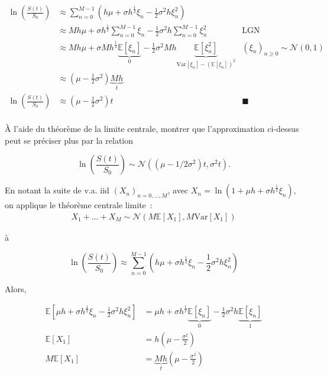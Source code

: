 \documentclass[answers, 10pt]{exam}
\begin{document}
\begin{questions}
\begin{solutionorbox}
		\begin{align*}
			\ln \left(  \frac{S(t)}{S_0} \right) &\approx \sum_{n=0}^{M-1}\left(  h\mu + \sigma h^{\frac{1}{2}} \xi_n - \frac{1}{2} \sigma^2 h \xi_n^2 \right)  \\
							     &\approx M h\mu + \sigma h^\frac{1}{2} \sum_{n=0}^{M-1} \xi_n - \frac{1}{2} \sigma^2 h \sum_{n=0}^{M-1} \xi_n^2 & \text{LGN}\\
							     &\approx M h \mu + \sigma M h^\frac{1}{2} \underbrace{\mathbb{E}\left[ \xi_n \right]}_{0} - \frac{1}{2} \sigma^2 Mh\underbrace{\mathbb{E}\left[ \xi_n^2 \right]}_{\text{Var}\left[\xi_n \right] - (\mathbb{E}\left[\xi_n \right])^2 } & (\xi_n)_{n\geq 0} \sim \mathcal{N}(0, 1)\\
							     &\approx \left(\mu - \frac{1}{2} \sigma^2  \right) \underbrace{Mh}_{t}\\
				\ln \left(  \frac{S(t)}{S_0} \right) &\approx \left(\mu - \frac{1}{2} \sigma^2  \right) t & \blacksquare\\
		\end{align*}
	\end{solutionorbox}

	\question
	\`A l'aide du théorème de la limite centrale, montrer que l'approximation ci-dessus peut se préciser plus par la relation

		\begin{equation*}
			\ln \left( \frac{S(t)}{S_0} \right) \sim \mathcal{N} \left(  \left(  \mu - 1/2 \sigma^2 \right)t, \sigma^2 t \right).
		\end{equation*}
	
	\begin{solutionorbox}
		En notant la suite de v.a. iid $(X_n)_{n=0,\dots,M}$, avec $X_n = \ln \left( 1 + \mu h + \sigma h^\frac{1}{2} \xi_n \right)$, on applique le théorème centrale limite~:
		\begin{align*}
			X_{1} + \dots + X_{M} \sim \mathcal{N}\left(M \mathbb{E}\left[X_1 \right], M \text{Var}\left[X_1 \right]\right)
		\end{align*}

		à 

		\begin{equation*}
			\ln \left(  \frac{S(t)}{S_0} \right) \approx \sum_{n=0}^{M-1}\left(  h\mu + \sigma h^{\frac{1}{2}} \xi_n - \frac{1}{2} \sigma^2 h \xi_n^2 \right)
		\end{equation*}

		Alors, 

		\begin{align*}			
			\mathbb{E}\left[\mu h + \sigma h^{\frac{1}{2}} \xi_n - \frac{1}{2} \sigma^2 h \xi_n^2\right] &= \mu h + \sigma h^{\frac{1}{2}} \underbrace{\mathbb{E}\left[\xi_n \right]}_{0} - \frac{1}{2} \sigma^2 h \underbrace{\mathbb{E}\left[ \xi_n\right]}_{1}\\
													  \mathbb{E}\left[X_1 \right] &= h \left( \mu - \frac{\sigma^2}{2} \right)\\
													  M\mathbb{E}\left[X_1 \right] &= \underbrace{Mh}_{t} \left( \mu - \frac{\sigma^2}{2} \right)
		\end{align*}


\end{solutionorbox}
\end{questions}
\end{document}
